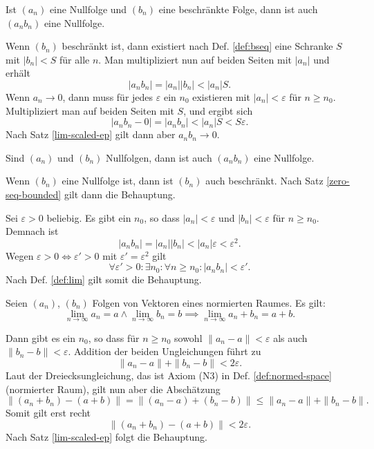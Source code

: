 \begin{Satz}\label{zero-seq-bounded}
Ist $(a_n)$ eine Nullfolge und $(b_n)$ eine beschränkte Folge,
dann ist auch $(a_n b_n)$ eine Nullfolge.
\end{Satz}

\begin{Beweis}
Wenn $(b_n)$ beschränkt ist, dann existiert nach
Def. \ref{def:bseq} eine Schranke $S$ mit
$|b_n|<S$ für alle $n$. Man multipliziert nun auf beiden Seiten
mit $|a_n|$ und erhält
\[|a_n b_n| = |a_n| |b_n| < |a_n| S.\]
Wenn $a_n\to 0$, dann muss für jedes $\varepsilon$
ein $n_0$ existieren mit $|a_n|<\varepsilon$ für $n\ge n_0$.
Multipliziert man auf beiden Seiten mit $S$, und ergibt sich
\[|a_n b_n-0| = |a_n b_n| < |a_n| S < S\varepsilon.\]
Nach Satz \ref{lim-scaled-ep} gilt dann
aber $a_n b_n\to 0$.\,\qedsymbol
\end{Beweis}

\begin{Satz}
Sind $(a_n)$ und $(b_n)$ Nullfolgen,
dann ist auch $(a_n b_n)$ eine Nullfolge.
\end{Satz}

\begin{Beweis}[Beweis 1]
Wenn $(b_n)$ eine Nullfolge ist, dann ist $(b_n)$ auch beschränkt.
Nach Satz \ref{zero-seq-bounded} gilt dann die Behauptung.
\end{Beweis}

\begin{Beweis}[Beweis 2]
Sei $\varepsilon>0$ beliebig.
Es gibt ein $n_0$, so dass
$|a_n|<\varepsilon$ und $|b_n|<\varepsilon$ für $n\ge n_0$.
Demnach ist
\[|a_n b_n| = |a_n| |b_n|< |a_n|\varepsilon <\varepsilon^2.\]
Wegen $\varepsilon>0\iff\varepsilon'>0$ mit
$\varepsilon'=\varepsilon^2$ gilt
\[\forall\varepsilon'{>}0\colon\exists n_0\colon\forall n{\ge}n_0\colon
|a_n b_n|<\varepsilon'.\]
Nach Def. \ref{def:lim} gilt somit die Behauptung.\,\qedsymbol
\end{Beweis}

\newpage
\begin{Satz}%
\label{lim-add}
Seien $(a_n)$, $(b_n)$ Folgen von Vektoren eines normierten Raumes.
Es gilt:
\[\lim_{n\to\infty} a_n = a\land \lim_{n\to\infty} b_n
= b \implies \lim_{n\to\infty} a_n+b_n = a+b.\]
\end{Satz}

\begin{Beweis}
Dann gibt es ein $n_0$, so dass für $n\ge n_0$ sowohl
$\|a_n-a\|<\varepsilon$ als auch $\|b_n-b\|<\varepsilon$.
Addition der beiden Ungleichungen führt zu
\[\|a_n-a\| + \|b_n-b\| < 2\varepsilon.\]
Laut der Dreiecksungleichung, das ist Axiom (N3) in Def.
\ref{def:normed-space} (normierter Raum), gilt nun aber die Abschätzung
\[\|(a_n+b_n)-(a+b)\| = \|(a_n-a)+(b_n-b)\| \le \|a_n-a\|+\|b_n-b\|.\]
Somit gilt erst recht
\[\|(a_n+b_n)-(a+b)\| < 2\varepsilon.\]
Nach Satz \ref{lim-scaled-ep} folgt die Behauptung.\,\qedsymbol
\end{Beweis}


